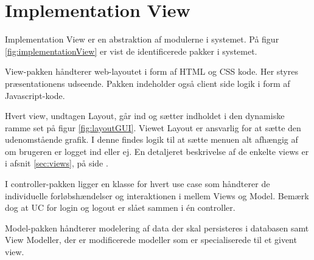 \section{Implementation View}
Implementation View er en abstraktion af modulerne i systemet. På figur \ref{fig:implementationView} er vist de identificerede pakker i systemet.


View-pakken håndterer web-layoutet i form af HTML og CSS kode. Her styres præsentationens udseende. Pakken indeholder også client side logik i form af Javascript-kode.

Hvert view, undtagen Layout, går ind og sætter indholdet i den dynamiske ramme set på figur \ref{fig:layoutGUI}. Viewet Layout er ansvarlig for at sætte den udenomstående grafik. I denne findes logik til at sætte menuen alt afhængig af om brugeren er logget ind eller ej. En detaljeret beskrivelse af de enkelte views er i afsnit \ref{sec:views}, på side \pageref{sec:views}.


I controller-pakken ligger en klasse for hvert use case som håndterer de individuelle forløbshændelser og interaktionen i mellem Views og Model. Bemærk dog at UC for login og logout er slået sammen i én controller. 

Model-pakken håndterer modelering af data der skal persisteres i databasen samt View Modeller, der er modificerede modeller som er specialiserede til et givent view.